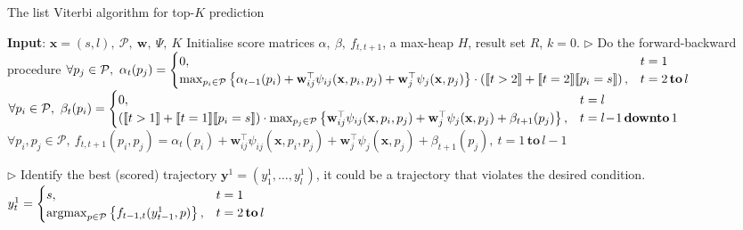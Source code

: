 \begin{algorithm}[htbp]
\caption{The list Viterbi algorithm for top-$K$ prediction~\cite{nilsson2001sequentially}}

\onehalfspacing

\begin{algorithmic}[1]
\STATE \textbf{Input}: $\mathbf{x}=(s, l),~ \mathcal{P},~ \mathbf{w},~ \Psi, ~K$
\STATE Initialise score matrices $\alpha,~ \beta,~ f_{t, t+1}$, a max-heap $H$, result set $R$, $k=0$.
\STATE $\triangleright$ Do the forward-backward procedure
\STATE $\forall p_j \in \mathcal{P},~ \alpha_t(p_j) =
        \begin{cases}
         0, & t = 1 \\
         \max_{p_i \in \mathcal{P}} \left\{ \alpha_{t-1}(p_i) + \mathbf{w}_{ij}^\top \psi_{ij}(\mathbf{x}, p_i, p_j) +
         \mathbf{w}_j^\top \psi_j(\mathbf{x}, p_j) \right\} \cdot 
         \left( \llbracket t > 2 \rrbracket + \llbracket t = 2 \rrbracket \llbracket p_i = s \rrbracket \right), & t=2 \, \textbf{to} \, l
        \end{cases}$
\STATE $\forall p_i \in \mathcal{P},~ \beta_t(p_i) =
         \begin{cases}
          0, & t = l \\
          \left( \llbracket t > 1 \rrbracket + \llbracket t = 1 \rrbracket \llbracket p_i = s \rrbracket \right) \cdot 
          \max_{p_j \in \mathcal{P}} \left\{ \mathbf{w}_{ij}^\top \psi_{ij}(\mathbf{x}, p_i, p_j) +
          \mathbf{w}_j^\top \psi_j(\mathbf{x}, p_j) + \beta_{t+1}(p_j) \right\}, & t = l\!-\!1 \, \textbf{downto} \, 1
         \end{cases}$
\STATE $\forall p_i, p_j \in \mathcal{P},~ f_{t,t+1}(p_i, p_j) = \alpha_t(p_i) + \mathbf{w}_{ij}^\top \psi_{ij}(\mathbf{x}, p_i, p_j) +
                             \mathbf{w}_j^\top \psi_j(\mathbf{x}, p_j) + \beta_{t+1}(p_j),~ t = 1 \, \textbf{to} \, l\!-\!1$

\STATE $\triangleright$ Identify the best (scored) trajectory $\mathbf{y}^1=(y_1^1,\dots,y_l^1)$, it could be a trajectory that violates the desired condition.
\STATE $y_t^1 = \begin{cases}
                  s, & t = 1 \\
                  \operatorname*{argmax}_{p \in \mathcal{P}} \left\{ f_{t-1,t}(y_{t-1}^1, p) \right\}, & t = 2 \, \textbf{to} \, l
                 \end{cases}$


\end{algorithmic}
\end{algorithm}

